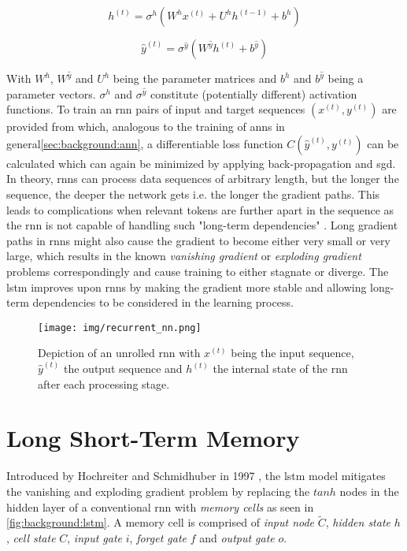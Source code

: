 \begin{equation}
h^{(t)} = \sigma^h (W^h x^{(t)} + U^h h^{(t-1)} + b^h)
\end{equation}

\begin{equation}
\hat{y}^{(t)} = \sigma^{\hat{y}} (W^{\hat{y}} h^{(t)} + b^{\hat{y}})
\end{equation}

With $W^h$, $W^{\hat{y}}$ and $U^h$ being the parameter matrices and $b^h$ and $b^{\hat{y}}$ being a parameter vectors. $\sigma^h$ and $\sigma^{\hat{y}}$ constitute (potentially different) activation functions.
To train an \gls{rnn} pairs of input and target sequences $(x^{(t)}, y^{(t)})$ are provided from which, analogous to the training of \glspl{ann} in general\ref{sec:background:ann}, a differentiable loss function $C(\hat{y}^{(t)}, y^{(t)})$ can be calculated which can again be minimized by applying back-propagation and \gls{sgd}. In theory, \glspl{rnn} can process data sequences of arbitrary length, but the longer the sequence, the deeper the network gets i.e. the longer the gradient paths. This leads to complications when relevant tokens are further apart in the sequence as the \gls{rnn} is not capable of handling such "long-term dependencies" \cite{rnn_review}. Long gradient paths in \glspl{rnn} might also cause the gradient to become either very small or very large, which results in the known \textit{vanishing gradient} or \textit{exploding gradient} problems correspondingly and cause training to either stagnate or diverge. The \gls{lstm} improves upon \glspl{rnn} by making the gradient more stable and allowing long-term dependencies to be considered in the learning process.

\begin{figure}[h]
	\centering
	\texttt{[image: img/recurrent\_nn.png]}
	\caption{Depiction of an unrolled \gls{rnn} with $x^{(t)}$ being the input sequence, $\hat{y}^{(t)}$ the output sequence and $h^{(t)}$ the internal state of the \gls{rnn} after each processing stage.}
	\label{fig:background:rnn}
\end{figure}

\section{Long Short-Term Memory}

Introduced by Hochreiter and Schmidhuber in 1997 \cite{lstm_origin}, the \gls{lstm} model mitigates the vanishing and exploding gradient problem by replacing the $tanh$ nodes in the hidden layer of a conventional \gls{rnn} with \textit{memory cells} as seen in \ref{fig:background:lstm}. 
A memory cell is comprised of \textit{input node} $\tilde{C}$, \textit{hidden state} $h$, \textit{cell state} $C$, \textit{input gate} $i$, \textit{forget gate} $f$ and \textit{output gate} $o$. 

